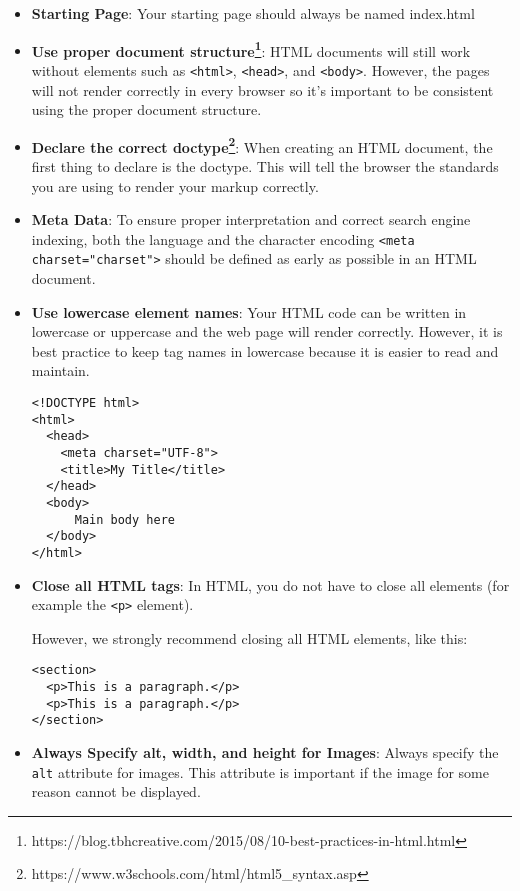\documentclass[english,11pt,a4paper]{report}
\newcommand{\bfb}[1]{{\bf \color{blue} #1}}
\begin{document}
\begin{itemize}
\item \bfb{Starting Page}: Your starting page should always be named index.html
\item \bfb{Use proper document structure\footnote{https://blog.tbhcreative.com/2015/08/10-best-practices-in-html.html}}: HTML documents will still work without elements such as \verb|<html>|, \verb|<head>|, and \verb|<body>|. However, the pages will not render correctly in every browser so it's important to be consistent using the proper document structure. 

\item \bfb{Declare the correct doctype\footnote{https://www.w3schools.com/html/html5\_syntax.asp}}: When creating an HTML document, the first thing to declare is the doctype. This will tell the browser the standards you are using to render your markup correctly. 

\item \bfb{Meta Data}: To ensure proper interpretation and correct search engine indexing, both the language and the character encoding \verb|<meta charset="charset">| should be defined as early as possible in an HTML document.

\item \bfb{Use lowercase element names}: Your HTML code can be written in lowercase or uppercase and the web page will render correctly. However, it is best practice to keep tag names in lowercase because it is easier to read and maintain.

\begin{lstlisting}[style=htmlcssjs]
<!DOCTYPE html>
<html>
  <head>
    <meta charset="UTF-8">
    <title>My Title</title>
  </head>
  <body>
      Main body here
  </body>
</html>
\end{lstlisting}

\item \bfb{Close all HTML tags}: In HTML, you do not have to close all elements (for example the \verb|<p>| element).

However, we strongly recommend closing all HTML elements, like this:
\begin{lstlisting}[style=htmlcssjs]
<section>
  <p>This is a paragraph.</p>
  <p>This is a paragraph.</p>
</section>
\end{lstlisting}



\item \bfb{Always Specify alt, width, and height for Images}: Always specify the \verb|alt| attribute for images. This attribute is important if the image for some reason cannot be displayed.


\end{itemize}
\end{document}
